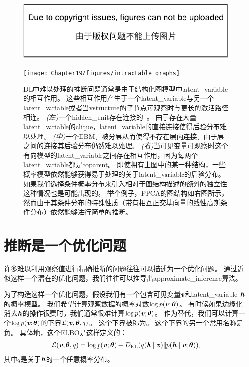 \begin{figure}[!htb]
\ifOpenSource
\centerline{\includegraphics{figure.pdf}}
\else
	\centerline{\texttt{[image: Chapter19/figures/intractable\_graphs]}}
\fi
\caption{\gls{DL}中难以处理的推断问题通常是由于结构化图模型中\gls{latent_variable}的相互作用。
这些相互作用产生于一个\gls{latent_variable}与另一个\gls{latent_variable}或者当\gls{vstructure}的子节点可观察时与更长的激活路径相连。
\emph{(左)}一个\gls{hidden_unit}存在连接的~\citep{Osindero+Hinton-2008}。
由于存在大量\gls{latent_variable}的\gls{clique}，\gls{latent_variable}的直接连接使得后验分布难以处理。
\emph{(中)}一个\gls{DBM}，被分层从而使得不存在层内连接，由于层之间的连接其后验分布仍然难以处理。
\emph{(右)}当可见变量可观察时这个有向模型的\gls{latent_variable}之间存在相互作用，因为每两个\gls{latent_variable}都是\gls{coparent}。
即使拥有上图中的某一种结构，一些概率模型依然能够获得易于处理的关于\gls{latent_variable}的后验分布。
如果我们选择条件概率分布来引入相对于图结构描述的额外的独立性这种情况也是可能出现的。
举个例子，\gls{PPCA}的图结构如右图所示，然而由于其条件分布的特殊性质（带有相互正交基向量的线性高斯条件分布）依然能够进行简单的推断。}
\label{fig:intractable_graphs}
\end{figure}



\section{推断是一个优化问题}
\label{sec:inference_as_optimization}

许多难以利用观察值进行精确推断的问题往往可以描述为一个优化问题。
通过近似这样一个潜在的优化问题，我们往往可以推导出\gls{approximate_inference}算法。


为了构造这样一个优化问题，假设我们有一个包含可见变量$\boldsymbol{\mathit{v}}$和\gls{latent_variable} $\boldsymbol{\mathit{h}}$的概率模型。
我们希望计算观察数据的概率对数$\log p(\boldsymbol{\mathit{v}};\boldsymbol{\theta})$。
有时候如果边缘化消去$\boldsymbol{\mathit{h}}$的操作很费时，我们通常很难计算$\log p(\boldsymbol{\mathit{v}};\boldsymbol{\theta})$。
作为替代，我们可以计算一个$\log p(\boldsymbol{\mathit{v}};\boldsymbol{\theta})$的下界$\mathcal{L}(\boldsymbol{\mathit{v}},{\boldsymbol{\theta}},q)$。
这个下界被称为。
这个下界的另一个常用名称是负。
具体地，这个\gls{ELBO}是这样定义的：
\begin{align}
\mathcal{L}(\boldsymbol{\mathit{v}},{\boldsymbol{\theta}},q) = \log p(\boldsymbol{\mathit{v}};{\boldsymbol{\theta}}) - D_{\text{KL}}(q(\boldsymbol{\mathit{h}}\mid\boldsymbol{\mathit{v}}) \Vert p(\boldsymbol{\mathit{h}}\mid\boldsymbol{\mathit{v}};{\boldsymbol{\theta}})),
\end{align}
其中$q$是关于$\boldsymbol{\mathit{h}}$的一个任意概率分布。


